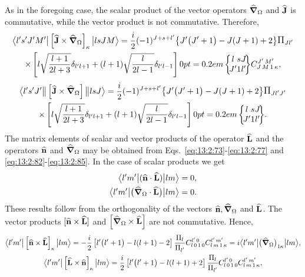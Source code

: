 As in the foregoing case, the scalar product of the vector operators \(\widehat{\boldsymbol{\nabla}}_{\Omega}\) and \(\widehat{\mathbf{J}}\) is commutative, while the vector product is not commutative. Therefore,
\begin{gather}
\braOket{ l^{\prime} s^{\prime} J^{\prime} M^{\prime}}{ \left[\widehat{\vect{J}} \times \delop_{\Omega}\right]_{\kappa}}{l s J M}=\frac{i}{2}(-1)^{J+s+l^{\prime}}\bigl\{J^{\prime}\bigl(J^{\prime}+1\bigr)-J(J+1)+2\bigr\} \Fact{J l^\prime} \notag \\
\times\left[l \sqrt{\frac{l+1}{2 l+3}} \delta_{l^{\prime} l+1}+(l+1) \sqrt{\frac{l}{2 l-1}} \delta_{l^{\prime} l-1}\right]
\sixj{l}{s}{J}{J^{\prime}}{1}{l^{\prime}} 
\clebsch{J}{M}{1}{\kappa}{J^{\prime}}{M^{\prime}}, \label{eq:13:2:157}
\end{gather}
\begin{multline*}
\braOketred{ l^{\prime} s^{\prime} J^{\prime}}{ \left[\widehat{\vect{J}} \times \delop_{\Omega}\right]}{l s J}=\frac{i}{2}(-1)^{J+s+l^{\prime}}\bigl\{J^{\prime}\bigl(J^{\prime}+1\bigr)-J(J+1)+2\bigr\} \Fact{J l^\prime J^{\prime}} \\
\times\left[l \sqrt{\frac{l+1}{2 l+3}} \delta_{l^{\prime} l+1}+(l+1) \sqrt{\frac{l}{2 l-1}} \delta_{l^{\prime} l-1}\right]
\sixj{l}{s}{J}{J^{\prime}}{1}{l^{\prime}}.
\end{multline*}
The matrix elements of scalar and vector products of the operator \(\widehat{\mathbf{L}}\) and the operators \(\widehat{\mathbf{n}}\) and \(\widehat{\boldsymbol{\nabla}}_{\Omega}\) may be obtained from Eqs.~\eqref{eq:13:2:73}-\eqref{eq:13:2:77} and \eqref{eq:13:2:82}-\eqref{eq:13:2:85}. In the case of scalar products we get
\begin{align}
\bigl\langle  l^{\prime} m^{\prime} \big| (\widehat{\mathbf{n}} \cdot \widehat{\mathbf{L}}) \big| l m \bigr\rangle & =0, \notag\\
\bigl\langle  l^{\prime} m^{\prime} \big| \bigl(\widehat{\boldsymbol{\nabla}}_{\Omega} \cdot \widehat{\mathbf{L}}\bigr) \big| l m \bigr\rangle & =0 . \label{eq:13:2:158}
\end{align}
These results follow from the orthogonality of the vectors \(\widehat{\mathbf{n}}, \widehat{\boldsymbol{\nabla}}_{\Omega}\) and \(\widehat{\mathbf{L}}\). The vector products \([\widehat{\mathbf{n}} \times \widehat{\mathbf{L}}]\) and \(\left[\widehat{\boldsymbol{\nabla}}_{\Omega} \times \widehat{\mathbf{L}}\right]\) are not commutative. Hence,
\begin{gather}
\braOket{ l^{\prime} m^{\prime}}{\left[\widehat{\vect{n}} \times \widehat{\vect{L}}\right]_{\kappa}}{l m}=-\frac{i}{2}\left[l^{\prime}\bigl(l^{\prime}+1\bigr)-l(l+1)-2\right] \frac{\Fact{l}}{\Fact{l^{\prime}}} 
\clebsch{l}{0}{1}{0}{l^{\prime}}{0} 
\clebsch{l}{m}{1}{\kappa}{l^{\prime}}{m^{\prime}}=i
\braOket{ l^{\prime} m^{\prime}}{\bigl(\delop_{\Omega}\bigr)_{1 \kappa}}{l m},  \label{eq:13:2:159}\\
\braOket{ l^{\prime} m^{\prime}}{\left[\widehat{\vect{L}} \times \widehat{\vect{n}}\right]_{\kappa}}{l m}=\frac{i}{2}\left[l^{\prime}\bigl(l^{\prime}+1\bigr)-l(l+1)+2\right] \frac{\Fact{l}}{\Fact{l^{\prime}}}
\clebsch{l}{0}{1}{0}{l^{\prime}}{0} 
\clebsch{l}{m}{1}{\kappa}{l^{\prime}}{m^{\prime}}, \label{eq:13:2:160}
\end{gather}
